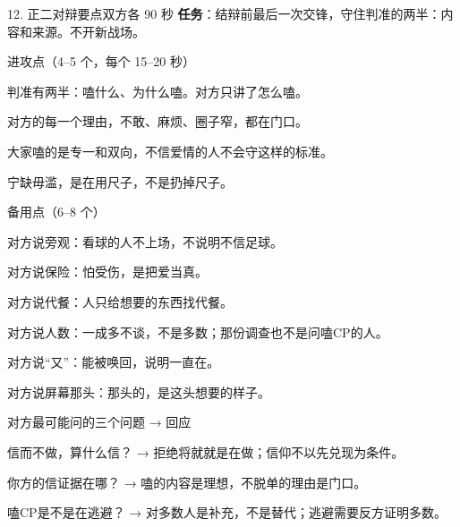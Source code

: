 \documentclass[script,pro]{debate}
\begin{document}
\begin{stage}{12. 正二对辩要点}{双方各 90 秒}
\textbf{任务}：结辩前最后一次交锋，守住判准的两半：内容和来源。不开新战场。
\begin{points}{进攻点（4–5 个，每个 15–20 秒）}
\item 判准有两半：嗑什么、为什么嗑。对方只讲了怎么嗑。
\item 对方的每一个理由，不敢、麻烦、圈子窄，都在门口。
\item 大家嗑的是专一和双向，不信爱情的人不会守这样的标准。
\item 宁缺毋滥，是在用尺子，不是扔掉尺子。
\end{points}
\begin{points}{备用点（6–8 个）}
\item 对方说旁观：看球的人不上场，不说明不信足球。
\item 对方说保险：怕受伤，是把爱当真。
\item 对方说代餐：人只给想要的东西找代餐。
\item 对方说人数：一成多不谈，不是多数；那份调查也不是问嗑CP的人。
\item 对方说“又”：能被唤回，说明一直在。
\item 对方说屏幕那头：那头的，是这头想要的样子。
\end{points}
\begin{points}{对方最可能问的三个问题 → 回应}
\item 信而不做，算什么信？ → 拒绝将就就是在做；信仰不以先兑现为条件。
\item 你方的信证据在哪？ → 嗑的内容是理想，不脱单的理由是门口。
\item 嗑CP是不是在逃避？ → 对多数人是补充，不是替代；逃避需要反方证明多数。
\end{points}
\end{stage}
\end{document}
